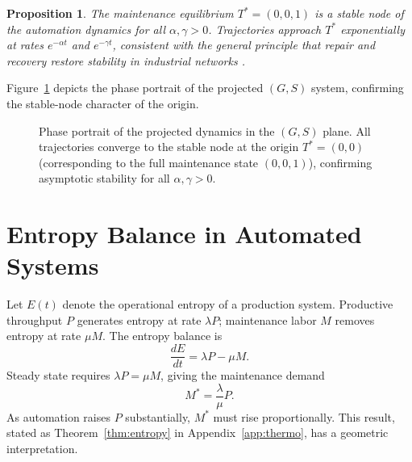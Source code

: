 \documentclass[12pt,a4paper]{article}
\theoremstyle{plain}
\newtheorem{proposition}[theorem]{Proposition}
\theoremstyle{definition}
\theoremstyle{remark}
\begin{document}
\begin{proposition}
The maintenance equilibrium $T^* = (0,0,1)$ is a stable node of the
automation dynamics for all $\alpha, \gamma > 0$.  Trajectories approach
$T^*$ exponentially at rates $e^{-\alpha t}$ and $e^{-\gamma t}$, consistent
with the general principle that repair and recovery restore stability in
industrial networks \cite{graham2007}.
\end{proposition}

Figure~\ref{fig:stability} depicts the phase portrait of the projected
$(G,S)$ system, confirming the stable-node character of the origin.

\begin{figure}[h]
\centering
{}
\caption{Phase portrait of the projected dynamics in the $(G,S)$ plane.
All trajectories converge to the stable node at the origin $T^*=(0,0)$
(corresponding to the full maintenance state $(0,0,1)$), confirming
asymptotic stability for all $\alpha,\gamma > 0$.}
\label{fig:stability}
\end{figure}

\section{Entropy Balance in Automated Systems}
\label{app:entropy}

Let $E(t)$ denote the operational entropy of a production system.
Productive throughput $P$ generates entropy at rate $\lambda P$; maintenance
labor $M$ removes entropy at rate $\mu M$.  The entropy balance is
\[
\frac{dE}{dt} = \lambda P - \mu M.
\]
Steady state requires $\lambda P = \mu M$, giving the maintenance demand
\[
M^* = \frac{\lambda}{\mu} P.
\]
As automation raises $P$ substantially, $M^*$ must rise proportionally.
This result, stated as Theorem~\ref{thm:entropy} in
Appendix~\ref{app:thermo}, has a geometric interpretation.
\end{document}
